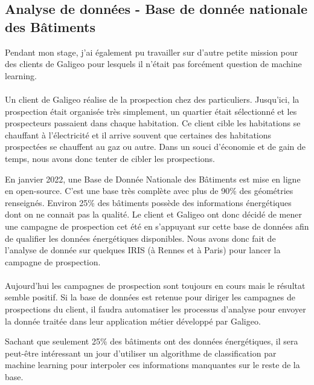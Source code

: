 \subsection{Analyse de données - Base de donnée nationale des Bâtiments}

Pendant mon stage, j’ai également pu travailler sur d’autre petite mission pour des clients de Galigeo pour lesquels il n’était pas forcément question de machine learning.

\paragraph{}

Un client de Galigeo réalise de la prospection chez des particuliers. Jusqu’ici, la prospection était organisée très simplement, un quartier était sélectionné et les prospecteurs passaient dans chaque habitation. Ce client cible les habitations se chauffant à l’électricité et il arrive souvent que certaines des habitations prospectées se chauffent au gaz ou autre. Dans un souci d’économie et de gain de temps, nous avons donc tenter de cibler les prospections.

En janvier 2022, une Base de Donnée Nationale des Bâtiments \cite{BDNB} est mise en ligne en open-source. C’est une base très complète avec plus de 90\% des géométries renseignés. Environ 25\% des bâtiments possède des informations énergétiques dont on ne connait pas la qualité. Le client et Galigeo ont donc décidé de mener une campagne de prospection cet été en s’appuyant sur cette base de données afin de qualifier les données énergétiques disponibles. Nous avons donc fait de l’analyse de donnée sur quelques IRIS (à Rennes et à Paris) pour lancer la campagne de prospection.

\paragraph{}

Aujourd’hui les campagnes de prospection sont toujours en cours mais le résultat semble positif. Si la base de données est retenue pour diriger les campagnes de prospections du client, il faudra automatiser les processus d’analyse pour envoyer la donnée traitée dans leur application métier développé par Galigeo.

Sachant que seulement 25\% des bâtiments ont des données énergétiques, il sera peut-être intéressant un jour d’utiliser un algorithme de classification par machine learning pour interpoler ces informations manquantes sur le reste de la base. 


